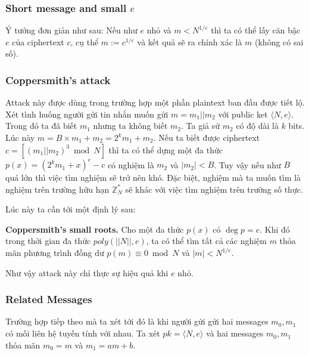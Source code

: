 \documentclass[12pt]{article}
\begin{document}
\subsubsection{Short message and small $e$}


Ý tưởng đơn giản như sau: Nếu như $\displaystyle e$ nhỏ và $\displaystyle m< N^{1/e}$ thì ta có thể lấy căn bậc $\displaystyle e$ của ciphertext $\displaystyle c$, cụ thể $\displaystyle m:=c^{1/e}$ và kết quả sẽ ra chính xác là $\displaystyle m$ (không có sai số). 


\subsubsection{Coppersmith's attack}


Attack này được dùng trong trường hợp một phần plaintext ban đầu được tiết lộ. Xét tình huống người gửi tin nhắn muốn gửi $\displaystyle m=m_{1} ||m_{2}$ với public ket $\displaystyle \langle N,e\rangle $. Trong đó ta đã biết $\displaystyle m_{1}$ nhưng ta không biết $\displaystyle m_{2}$. Ta giả sử $\displaystyle m_{2}$ có độ dài là $\displaystyle k$ bits. Lúc này $\displaystyle m=B\times m_{1} +m_{2} =2^{k} m_{1} +m_{2}$. Nếu ta biết được ciphertext $\displaystyle c=\left[( m_{1} ||m_{2})^{3}\bmod N\right]$ thì ta có thể dựng một đa thức $\displaystyle p( x) =\left( 2^{k} m_{1} +x\right)^{e} -c$ có nghiệm là $\displaystyle m_{2}$ và $\displaystyle |m_{2} |< B$. Tuy vậy nếu như $\displaystyle B$ quá lớn thì việc tìm nghiệm sẽ trở nên khó. Đặc biệt, nghiệm mà ta muốn tìm là nghiệm trên trường hữu hạn $\displaystyle \mathbb{Z}_{N}^{*}$ sẽ khác với việc tìm nghiệm trên trường số thực. 

Lúc này ta cần tới một định lý sau:

\textbf{Coppersmith's small roots.} Cho một đa thức $\displaystyle p( x)$ có $\displaystyle \deg p=e$. Khi đó trong thời gian đa thức $\displaystyle poly( ||N||,e)$, ta có thể tìm tất cả các nghiệm $\displaystyle m$ thỏa mãn phương trình đồng dư $\displaystyle p( m) \equiv 0\bmod N$ và $\displaystyle |m|< N^{1/e}$.

Như vậy attack này chỉ thực sự hiệu quả khi $\displaystyle e$ nhỏ. 



\subsubsection{Related Messages}

Trường hợp tiếp theo mà ta xét tới đó là khi người gửi gửi hai messages $\displaystyle m_{0} ,m_{1}$ có mối liên hệ tuyến tính với nhau. Ta xét $\displaystyle pk=\langle N,e\rangle $ và hai messages $\displaystyle m_{0} ,m_{1}$ thỏa mãn $\displaystyle m_{0} =m$ và $\displaystyle m_{1} =am+b$.
\end{document}
